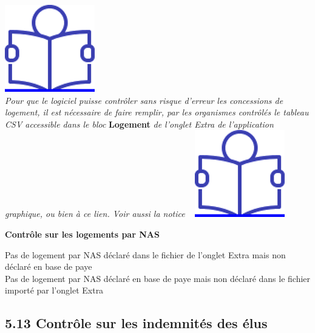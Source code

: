 \href{../Docs/Notices/fiche_NAS.odt}{\includegraphics{icones/Notice.png}}\\
\emph{Pour que le logiciel puisse contrôler sans risque d'erreur les
concessions de logement, il est nécessaire de faire remplir, par les
organismes contrôlés le tableau CSV accessible dans le bloc}
\textbf{Logement} \emph{de l'onglet Extra de l'application graphique, ou
bien à ce lien. Voir aussi la notice} ~
\href{../Docs/Notices/fiche_tableau_logements.odt}{\includegraphics{icones/Notice.png}}

\textbf{Contrôle sur les logements par NAS}

Pas de logement par NAS déclaré dans le fichier de l'onglet Extra mais
non déclaré en base de paye\\
Pas de logement par NAS déclaré en base de paye mais non déclaré dans le
fichier importé par l'onglet Extra

\hypertarget{controle-sur-les-indemnites-des-elus}{%
\subsection{5.13 Contrôle sur les indemnités des
élus}\label{controle-sur-les-indemnites-des-elus}}

